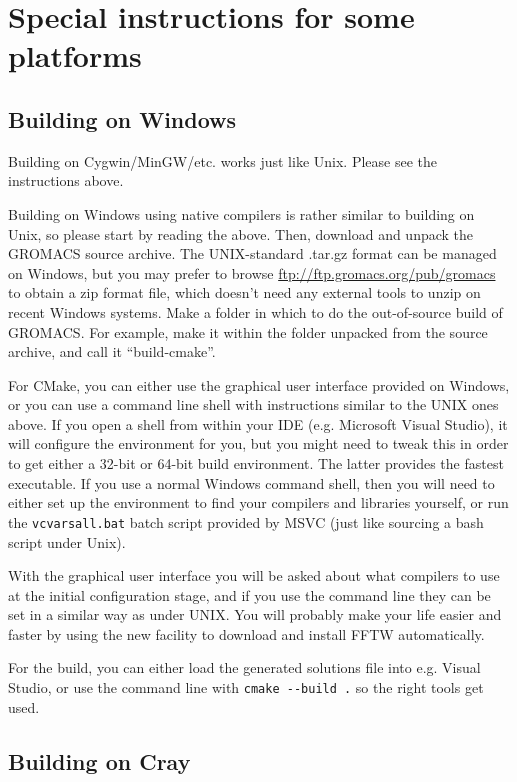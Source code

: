 \documentclass{article}[12pt,a4paper,twoside]
\newcommand{\gromacs}{GROMACS}
\newcommand{\fftw}{FFTW}
\newcommand{\cmake}{CMake}
\begin{document}
\section{Special instructions for some platforms}

\subsection{Building on Windows}
Building on Cygwin/MinGW/etc. works just like Unix. Please see the
instructions above.

Building on Windows using native compilers is rather similar to
building on Unix, so please start by reading the above. Then, download
and unpack the GROMACS source archive. The UNIX-standard .tar.gz
format can be managed on Windows, but you may prefer to browse
\url{ftp://ftp.gromacs.org/pub/gromacs} to obtain a zip format file,
which doesn't need any external tools to unzip on recent Windows
systems. Make a folder in which to do the out-of-source build of
\gromacs{}. For example, make it within the folder unpacked from the
source archive, and call it ``build-cmake''. 

For \cmake{}, you can either use the graphical user interface provided
on Windows, or you can use a command line shell with instructions
similar to the UNIX ones above. If you open a shell from within
your IDE (e.g. Microsoft Visual Studio), it will configure the
environment for you, but you might need to tweak this in order to 
get either a 32-bit or 64-bit build environment. The latter provides the
fastest executable. If you use a normal Windows command shell, then
you will need to either set up the environment to find your compilers
and libraries yourself, or run the \verb+vcvarsall.bat+ batch script
provided by MSVC (just like sourcing a bash script under
Unix). 

With the graphical user interface you will be asked about what compilers
to use at the initial configuration stage, and if you use the command line
they can be set in a similar way as under UNIX.
You will probably make your life easier and faster by using the
new facility to download and install \fftw{} automatically. 

For the build, you can either load the generated solutions file into
e.g. Visual Studio, or use the command line with \verb+cmake --build .+ 
so the right tools get used.

\subsection{Building on Cray}
\end{document}
